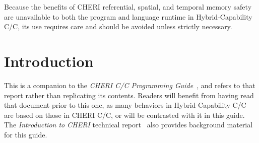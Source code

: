 \documentclass[12pt,twoside,openright,a4paper]{article}
\newcommand{\note}[2]{{\color{blue}[ Note: #1 - #2]}}
\renewcommand{\note}[2]{\relax\ifhmode\unskip\fi}
\newcommand{\rwnote}[1]{\note{#1}{Robert W.}}
\newcommand{\nwfnote}[1]{\note{#1}{nwf}}
\newcommand*{\cpp}{\texorpdfstring{C\textsmaller[2]{\protect\nolinebreak[4]\hspace{-.05em}\raisebox{.45ex}{\textbf{++}}}}{C++}}
\newcommand*{\COrCpp}{C/\cpp{}}
\newcommand*{\purecapCOrCpp}{CHERI \COrCpp{}}
\newcommand*{\hybridCOrCpp}{Hybrid-Capability \COrCpp{}}
\begin{document}
{\nwfnote{Do you want to call out partially adapted compartmentalized programs
(possibly inclusive of programs with their own runtime systems; one could
imagine enriching JS to have a ForeignCapability type, e.g.) as another
possible example where being able to exchange capabilities might be useful
despite possibly having a non-NULL DDC?}


Because the benefits of CHERI referential, spatial, and temporal memory safety are
unavailable to both the program and language runtime in \hybridCOrCpp{},
its use requires care and should be avoided unless strictly necessary.

}

\newcommand{\reviewwarning}{
\textbf{
As \hybridCOrCpp{} remains an area of active research and development, this
report is a request for review and comments rather than a specification.
}
\rwnote{This last sentence will go away in a final version.}
}

\begin{abstract}
\abstracttext

\reviewwarning
\end{abstract}

\newpage
\setcounter{tocdepth}{2}
\tableofcontents

\newpage

\section{Introduction}

%
%
\abstracttext

This is a companion to the \textit{\purecapCOrCpp{} Programming
Guide}~\cite{UCAM-CL-TR-947}, and refers to that report rather than
replicating its contents.
Readers will benefit from having read that document prior to this one, as
many behaviors in \hybridCOrCpp{} are based on those in \purecapCOrCpp{}, or
will be contrasted with it in this guide.
The \textit{Introduction to CHERI} technical
report~\cite{UCAM-CL-TR-941} also provides background material for this
guide.
\end{document}
